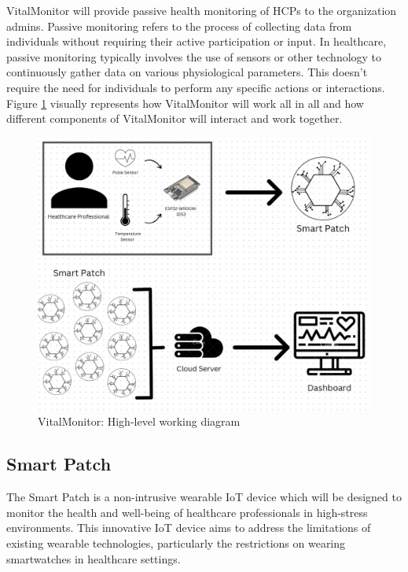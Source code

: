 \noindent VitalMonitor will provide passive health monitoring of HCPs to the organization admins. Passive monitoring refers to the process of collecting data from individuals without requiring their active participation or input. In healthcare, passive monitoring typically involves the use of sensors or other technology to continuously gather data on various physiological parameters. This doesn't require the need for individuals to perform any specific actions or interactions. \\ 

Figure \ref{fig:sys-desc} visually represents how VitalMonitor will work all in all and how different components of VitalMonitor will interact and work together.

\begin{figure}
    \centering
    \includegraphics[width=0.9\linewidth]{images/sys-desc.png}
    \caption{VitalMonitor: High-level working diagram}
    \label{fig:sys-desc}
\end{figure}

\subsection{Smart Patch}
The Smart Patch is a non-intrusive wearable IoT device which will be designed to monitor the health and well-being of healthcare professionals in high-stress environments. This innovative IoT device aims to address the limitations of existing wearable technologies, particularly the restrictions on wearing smartwatches in healthcare settings. \\ 

